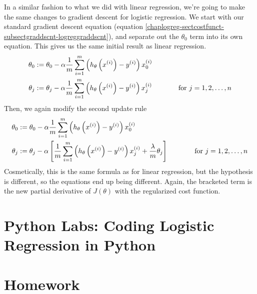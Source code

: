 In a similar fashion to what we did with linear regression, we're going to make the same changes to gradient descent for logistic regression. We start with our standard gradient descent equation (equation \ref{chaplogreg-sectcostfunct-subsectgraddscnt-logreggraddscnt}), and separate out the $\theta_0$ term into its own equation. This gives us the same initial result as linear regression. 
\begin{align}
\theta_0 &:= \theta_0 - \alpha \frac{1}{m} \sum_{i=1}^m \left( h_\theta\left(x^{(i)}\right) - y^{(i)}\right) x_0^{(i)} \\
\theta_j &:= \theta_j - \alpha \frac{1}{m} \sum_{i=1}^m \left( h_\theta\left(x^{(i)}\right) - y^{(i)}\right) x_j^{(i)} ~~\mbox{\;\;\;\;\;\;\;\;\;\; for } j = 1, 2, \dots, n 
\end{align}
Then, we again modify the second update rule
\begin{subequations}
\begin{align}
\theta_0 &:= \theta_0 - \alpha \frac{1}{m} \sum_{i=1}^m \left( h_\theta\left(x^{(i)}\right) - y^{(i)}\right) x_0^{(i)} \\
\theta_j &:= \theta_j - \alpha \left[\frac{1}{m} \sum_{i=1}^m \left( h_\theta\left(x^{(i)}\right) - y^{(i)}\right) x_j^{(i)} + \frac{\lambda}{m}\theta_j \right] ~~\mbox{\;\;\;\;\;\;\;\;\;\; for } j = 1, 2, \dots, n
\end{align}
\end{subequations}
Cosmetically, this is the same formula as for linear regression, but the hypothesis is different, so the equations end up being different. Again, the bracketed term is the new partial derivative of $J\left(\theta\right)$ with the regularized cost function. 














\section{Python Labs: Coding Logistic Regression in Python}
\section{Homework}




























